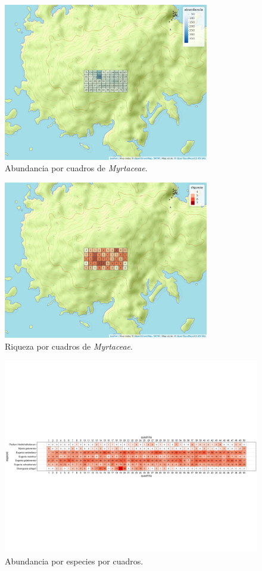 \documentclass[11pt,]{article}
\begin{document}
\begin{figure}
\centering
\includegraphics[width=0.80000\textwidth]{mapa_cuadros_abun_mi_familia.png}
\caption{Abundancia por cuadros de
\emph{Myrtaceae}.\label{fig:abumifam}}
\end{figure}

\begin{figure}
\centering
\includegraphics[width=0.80000\textwidth]{mapa_cuadros_riq_mi_familia.png}
\caption{Riqueza por cuadros de \emph{Myrtaceae}.\label{fig:riqmifam}}
\end{figure}

\begin{figure}
\centering
\includegraphics[width=1.00000\textwidth]{abuespecua.png}
\caption{Abundancia por especies por cuadros.\label{fig:abuxcua}}
\end{figure}
\end{document}
